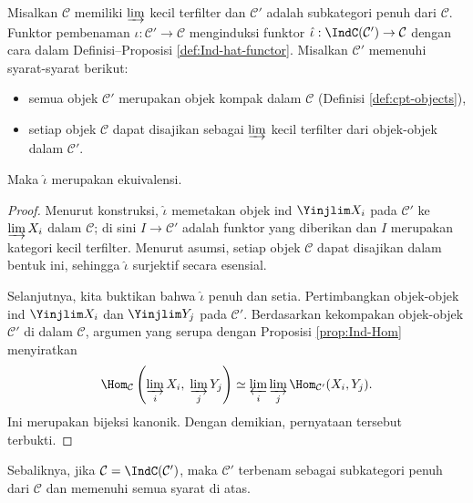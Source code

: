 \begin{proposition}\label{prop:recognition-Ind}
	Misalkan $\mathcal{C}$ memiliki $\varinjlim$ kecil terfilter dan $\mathcal{C}'$ adalah subkategori penuh dari $\mathcal{C}$. Funktor pembenaman $\iota: \mathcal{C}' \to \mathcal{C}$ menginduksi funktor $\hat{\iota}: \IndC(\mathcal{C}') \to \mathcal{C}$ dengan cara dalam Definisi--Proposisi \ref{def:Ind-hat-functor}. Misalkan $\mathcal{C}'$ memenuhi syarat-syarat berikut:
	\begin{itemize}
		\item semua objek $\mathcal{C}'$ merupakan objek kompak dalam $\mathcal{C}$ (Definisi \ref{def:cpt-objects}),
		\item setiap objek $\mathcal{C}$ dapat disajikan sebagai $\varinjlim$ kecil terfilter dari objek-objek dalam $\mathcal{C}'$.
	\end{itemize}
	Maka $\hat{\iota}$ merupakan ekuivalensi.
\end{proposition}
\begin{proof}
	Menurut konstruksi, $\hat{\iota}$ memetakan objek ind $\Yinjlim X_i$ pada $\mathcal{C}'$ ke $\varinjlim X_i$ dalam $\mathcal{C}$; di sini $I \to \mathcal{C}'$ adalah funktor yang diberikan dan $I$ merupakan kategori kecil terfilter. Menurut asumsi, setiap objek $\mathcal{C}$ dapat disajikan dalam bentuk ini, sehingga $\hat{\iota}$ surjektif secara esensial.
	
	Selanjutnya, kita buktikan bahwa $\hat{\iota}$ penuh dan setia. Pertimbangkan objek-objek ind $\Yinjlim X_i$ dan $\Yinjlim Y_j$ pada $\mathcal{C}'$. Berdasarkan kekompakan objek-objek $\mathcal{C}'$ di dalam $\mathcal{C}$, argumen yang serupa dengan Proposisi \ref{prop:Ind-Hom} menyiratkan
	\begin{gather*}
		\Hom_{\mathcal{C}}\left( \varinjlim_i X_i, \; \varinjlim_j Y_j\right) \simeq \varprojlim_i \varinjlim_j \Hom_{\mathcal{C}'}(X_i, Y_j).
	\end{gather*}
	Ini merupakan bijeksi kanonik. Dengan demikian, pernyataan tersebut terbukti.
\end{proof}

Sebaliknya, jika $\mathcal{C} = \IndC(\mathcal{C}')$, maka $\mathcal{C}'$ terbenam sebagai subkategori penuh dari $\mathcal{C}$ dan memenuhi semua syarat di atas.
